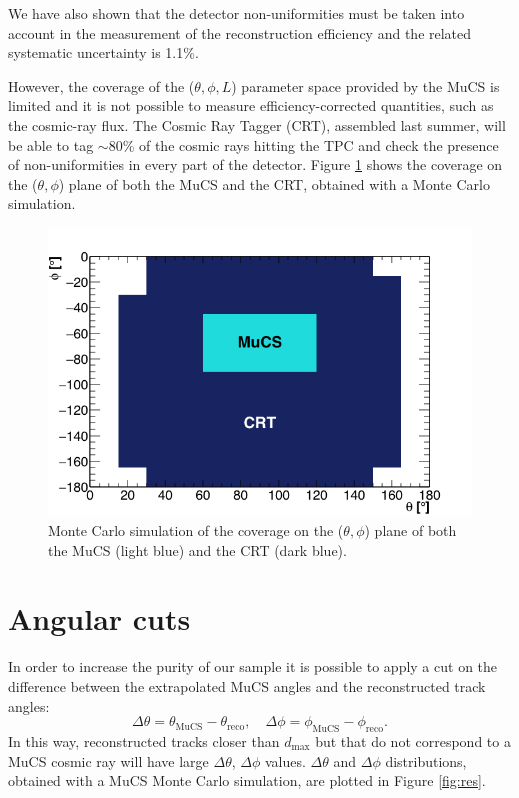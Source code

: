 \documentclass[a4paper]{scrartcl}
\begin{document}
We have also shown that the detector non-uniformities must be taken into account in the measurement of the reconstruction efficiency and the related systematic uncertainty is 1.1\%.

However, the coverage of the ($\theta, \phi, L$) parameter space provided by the MuCS is limited and it is not possible to measure efficiency-corrected quantities, such as the cosmic-ray flux. The Cosmic Ray Tagger (CRT), assembled last summer, will be able to tag $\sim$80\% of the cosmic rays hitting the TPC and check the presence of non-uniformities in every part of the detector. Figure \ref{fig:crt} shows the coverage on the ($\theta,\phi$) plane of both the MuCS and the CRT, obtained with a Monte Carlo simulation.

\begin{figure}[htbp]
  \begin{center}
    \includegraphics[width=0.7\linewidth]{figures/crt.png}
    \caption{Monte Carlo simulation of the coverage on the ($\theta,\phi$) plane of both the MuCS (light blue) and the CRT (dark blue).} \label{fig:crt}
  \end{center}
\end{figure}

\clearpage{}

\appendix
\section{Angular cuts}
In order to increase the purity of our sample it is possible to apply a cut on the difference between the extrapolated MuCS angles and the reconstructed track angles:
\begin{equation}
\Delta\theta = \theta_{\mathrm{MuCS}}-\theta_{\mathrm{reco}}, \quad \Delta\phi = \phi_{\mathrm{MuCS}}-\phi_{\mathrm{reco}}.
\end{equation}
In this way, reconstructed tracks closer than $d_{\mathrm{max}}$ but that do not correspond to a MuCS cosmic ray will have large $\Delta\theta$, $\Delta\phi$ values. $\Delta\theta$ and $\Delta\phi$ distributions, obtained with a MuCS Monte Carlo simulation, are plotted in Figure \ref{fig:res}.
\end{document}
